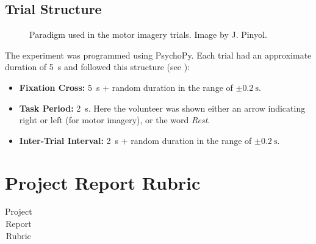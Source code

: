 \documentclass[11pt]{exam}
\begin{document}
\begin{appendices}
        \subsection{Trial Structure}
        \begin{figure}[htbp]
            \centering
            \caption{Paradigm used in the motor imagery trials. Image by J. Pinyol.}
            \label{fig:paradigm}
        \end{figure}
        The experiment was programmed using PsychoPy. Each trial had an approximate duration of \SI{5}{\second} and followed this structure (see ): %
        \begin{itemize}
            \item \textbf{Fixation Cross:} \SI{5}{\second} + random duration in the range of $\pm\SI{0.2}{\second}$.
            \item \textbf{Task Period:} \SI{2}{\second}. Here the volunteer was shown either an arrow indicating right or left (for motor imagery), or the word \emph{Rest}.
            \item \textbf{Inter-Trial Interval:} \SI{2}{\second} + random duration in the range of $\pm\SI{0.2}{\second}$.
        \end{itemize}

        \clearpage
        \section{Project Report Rubric}
        \label{ann:projectrubric}
        \renewcommand{\arraystretch}{1.5}
        \scriptsize %
        \begin{longtable}{|>{\raggedright\arraybackslash}m{1.8cm}|>{\raggedright\arraybackslash}m{3.1cm}|>{\raggedright\arraybackslash}m{2.5cm}|>{\raggedright\arraybackslash}m{2.7cm}|>{\raggedright\arraybackslash}m{2.1cm}|>{\raggedright\arraybackslash}m{1.5cm}|c|}

            \caption{Project Report Rubric} \\


\end{longtable}
\end{appendices}
\end{document}
